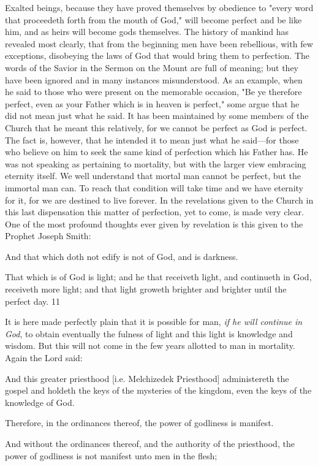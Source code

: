 Exalted beings, because they have proved themselves by obedience to "every word that
proceedeth forth from the mouth of God," will become perfect and be like him, and as heirs
will become gods themselves. The history of mankind has revealed most clearly, that from
the beginning men have been rebellious, with few exceptions, disobeying the laws of God
that would bring them to perfection. The words of the Savior in the Sermon on the Mount are
full of meaning; but they have been ignored and in many instances misunderstood. As an
example, when he said to those who were present on the memorable occasion, "Be ye
therefore perfect, even as your Father which is in heaven is perfect," some argue that he did
not mean just what he said. It has been maintained by some members of the Church that he
meant this relatively, for we cannot be perfect as God is perfect. The fact is, however, that he
intended it to mean just what he said—for those who believe on him to seek the same kind of
perfection which his Father has. He was not speaking as pertaining to mortality, but with the
larger view embracing eternity itself. We well understand that mortal man cannot be perfect,
but the immortal man can. To reach that condition will take time and we have eternity for it,
for we are destined to live forever. In the revelations given to the Church in this last
dispensation this matter of perfection, yet to come, is made very clear. One of the most
profound thoughts ever given by revelation is this given to the Prophet Joseph Smith:

And that which doth not edify is not of God, and is darkness.

That which is of God is light; and he that receiveth light, and continueth in God, receiveth
more light; and that light groweth brighter and brighter until the perfect day. 11

It is here made perfectly plain that it is possible for man, \textit{if he will continue in God}, to obtain
eventually the fulness of light and this light is knowledge and wisdom. But this will not come
in the few years allotted to man in mortality. Again the Lord said:

And this greater priesthood [i.e. Melchizedek Priesthood] administereth the gospel and
holdeth the keys of the mysteries of the kingdom, even the keys of the knowledge of God.

Therefore, in the ordinances thereof, the power of godliness is manifest.

And without the ordinances thereof, and the authority of the priesthood, the power of
godliness is not manifest unto men in the flesh;

